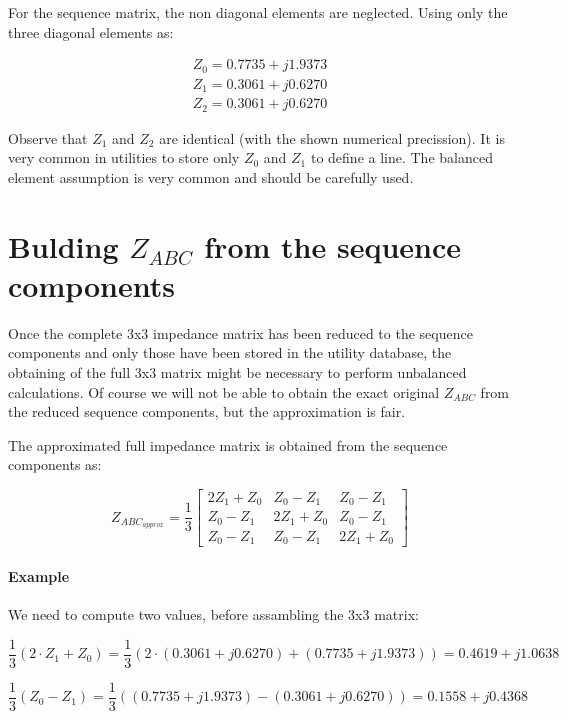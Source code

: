 \documentclass{tufte-book}
\begin{document}
For the sequence matrix, the non diagonal elements are neglected. Using only the three diagonal elements as:

$$
\begin{array}{c}
Z_0 = 0.7735 + j 1.9373 \\
Z_1 = 0.3061 + j 0.6270 \\
Z_2 = 0.3061  +  j 0.6270
\end{array}
$$

Observe that $Z_1$ and $Z_2$ are identical (with the shown numerical precission). It is very common in utilities to store only $Z_0$ and $Z_1$ to define a line. The balanced element assumption is very common and should be carefully used.

\section{Bulding $Z_{ABC}$ from the sequence components}

Once the complete 3x3 impedance matrix has been reduced to the sequence components and only those have been stored in the utility database, the obtaining of the full 3x3 matrix might be necessary to perform unbalanced calculations. Of course we will not be able to obtain the exact original $Z_{ABC}$ from the reduced sequence components, but the approximation is fair.

The approximated full impedance matrix is obtained from the sequence components as:

\begin{equation}
Z_{ABC_{approx}} = \frac{1}{3}\left[ \begin{array}{ccc}
2Z_1 + Z_0 & Z_0 - Z_1 & Z_0 - Z_1 \\
Z_0 - Z_1 & 2Z_1 + Z_0 & Z_0 - Z_1 \\ 
Z_0 - Z_1 & Z_0 - Z_1 & 2Z_1 + Z_0
\end{array} \right]
\end{equation}

\paragraph{Example}

We need to compute two values, before assambling the 3x3 matrix:

$$
\frac{1}{3}(2 \cdot Z_1 + Z_0) = \frac{1}{3} (2\cdot(0.3061 + j 0.6270) + (0.7735 + j 1.9373)) = 0.4619 + j1.0638
$$

$$
\frac{1}{3} (Z_0 - Z_1) = \frac{1}{3}((0.7735 + j 1.9373) - (0.3061 + j 0.6270)) = 0.1558 + j0.4368
$$
\end{document}

